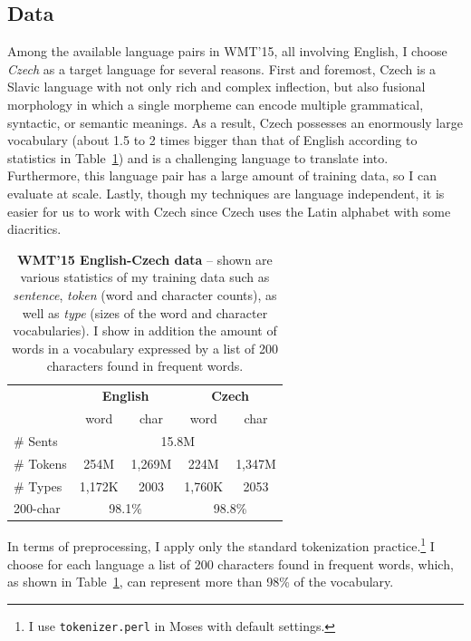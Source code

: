 \subsection{Data}
Among the available language pairs in WMT'15, all involving English, 
I choose {\it Czech} as a target language for several reasons. First and
foremost, Czech is a Slavic language with not only rich
and complex inflection,
but also fusional morphology in which a single morpheme can encode multiple
grammatical, syntactic, or semantic meanings. As a result, Czech possesses an enormously large
vocabulary (about 1.5 to 2 times bigger than that of English according to 
statistics in Table~\ref{t:data}) and is a challenging language to translate
into. Furthermore, this language pair has a large
amount of training data, so %
I can evaluate at scale. Lastly, though my techniques are language
independent, it is easier for us to work with Czech since Czech uses the Latin alphabet with some
diacritics. %

\begin{table} %
\centering
\begin{tabular}{l|c|c|c|c}
& \multicolumn{2}{c|}{\bf{English}} & \multicolumn{2}{c}{\bf{Czech}}\\
  \cline{2-5}
& word & char & word & char \\
  \hline
  \# Sents & \multicolumn{4}{c}{15.8M} \\
  \hdashline
  \# Tokens & 254M & 1,269M & 224M & 1,347M \\ 
 \hdashline
  \# Types & 1,172K & 2003 & 1,760K & 2053\\ 
  \hline
  200-char & \multicolumn{2}{c|}{98.1\%} & \multicolumn{2}{c}{98.8\%} \\
\end{tabular}
\caption[WMT'15 English-Czech data]{{\bf WMT'15 English-Czech data} -- shown are various statistics of my training
data such as {\it sentence}, {\it token} (word and character counts), as well as
{\it type} (sizes of the word and character vocabularies).
I show in addition the amount of words in a vocabulary expressed by a list of 200 characters found
in frequent words.}
\label{t:data}
\end{table}

In terms of preprocessing, I apply only the standard tokenization practice.\footnote{I use \texttt{tokenizer.perl} in Moses with
default settings.} I choose for each language a list of 200
characters found in frequent words, which, as shown in Table~\ref{t:data}, can
represent more than 98\% of the vocabulary. 

